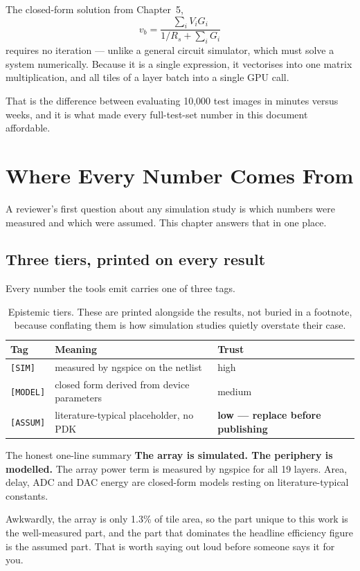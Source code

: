 \documentclass[11pt,a4paper]{report}
\begin{document}
The closed-form solution from Chapter~5,
\[
v_b = \frac{\sum_i V_i G_i}{1/R_s + \sum_i G_i}
\]
requires no iteration --- unlike a general circuit simulator, which must solve
a system numerically. Because it is a single expression, it vectorises into
one matrix multiplication, and all tiles of a layer batch into a single GPU
call.

That is the difference between evaluating 10{,}000 test images in minutes
versus weeks, and it is what made every full-test-set number in this document
affordable.


\chapter{Where Every Number Comes From}

A reviewer's first question about any simulation study is which numbers were
measured and which were assumed. This chapter answers that in one place.

\section{Three tiers, printed on every result}

Every number the tools emit carries one of three tags.

\begin{table}[h]
\centering
\caption{Epistemic tiers. These are printed alongside the results, not buried
in a footnote, because conflating them is how simulation studies quietly
overstate their case.}
\begin{tabular}{llp{6.2cm}}
\toprule
Tag & Meaning & Trust \\
\midrule
\texttt{[SIM]}   & measured by ngspice on the netlist & high \\
\texttt{[MODEL]} & closed form derived from device parameters & medium \\
\texttt{[ASSUM]} & literature-typical placeholder, no PDK & \textbf{low --- replace before publishing} \\
\bottomrule
\end{tabular}
\end{table}

\begin{keybox}{The honest one-line summary}
\textbf{The array is simulated. The periphery is modelled.} The array power
term is measured by ngspice for all 19 layers. Area, delay, ADC and DAC
energy are closed-form models resting on literature-typical constants.

Awkwardly, the array is only 1.3\% of tile area, so the part unique to this
work is the well-measured part, and the part that dominates the headline
efficiency figure is the assumed part. That is worth saying out loud before
someone says it for you.
\end{keybox}
\end{document}
